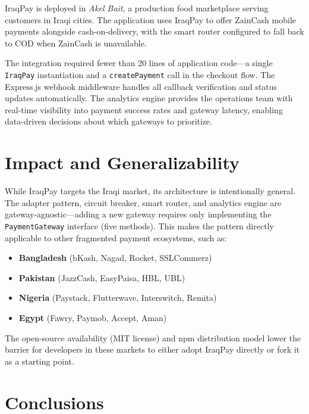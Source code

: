 \documentclass[preprint,12pt]{elsarticle}
\begin{document}
IraqPay is deployed in \emph{Akel Bait}, a production food marketplace serving customers in Iraqi cities. The application uses IraqPay to offer ZainCash mobile payments alongside cash-on-delivery, with the smart router configured to fall back to COD when ZainCash is unavailable.

The integration required fewer than 20 lines of application code---a single \texttt{IraqPay} instantiation and a \texttt{createPayment} call in the checkout flow. The Express.js webhook middleware handles all callback verification and status updates automatically. The analytics engine provides the operations team with real-time visibility into payment success rates and gateway latency, enabling data-driven decisions about which gateways to prioritize.

\section{Impact and Generalizability}
\label{sec:impact}

While IraqPay targets the Iraqi market, its architecture is intentionally general. The adapter pattern, circuit breaker, smart router, and analytics engine are gateway-agnostic---adding a new gateway requires only implementing the \texttt{PaymentGateway} interface (five methods). This makes the pattern directly applicable to other fragmented payment ecosystems, such as:

\begin{itemize}
\item \textbf{Bangladesh} (bKash, Nagad, Rocket, SSLCommerz)
\item \textbf{Pakistan} (JazzCash, EasyPaisa, HBL, UBL)
\item \textbf{Nigeria} (Paystack, Flutterwave, Interswitch, Remita)
\item \textbf{Egypt} (Fawry, Paymob, Accept, Aman)
\end{itemize}

The open-source availability (MIT license) and npm distribution model lower the barrier for developers in these markets to either adopt IraqPay directly or fork it as a starting point.

\section{Conclusions}
\label{sec:conclusions}
\end{document}
